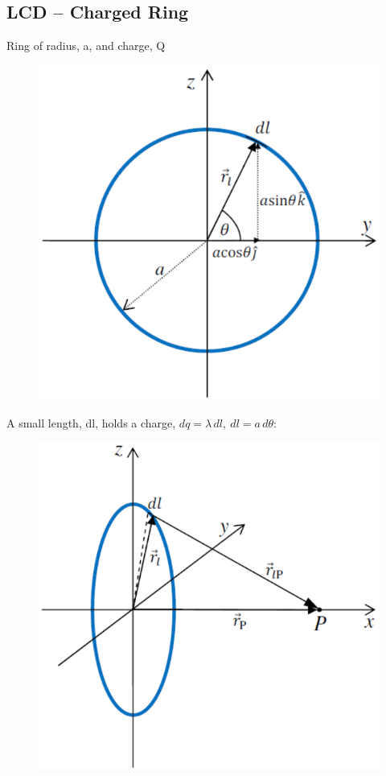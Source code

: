 \documentclass[a4paper, 11pt, normalem]{report}
\begin{document}
\subsection{LCD -- Charged Ring}
Ring of radius, a, and charge, Q
\begin{figure}[H]
    \centering
    \includegraphics[scale=0.4]{Selection_004.png}
\end{figure}
A small length, dl, holds a charge, $dq = \lambda\,dl,~dl = a\,d\theta$:
\begin{figure}[H]
    \centering
    \includegraphics[scale=0.4]{D1.png}
\end{figure}
\end{document}
